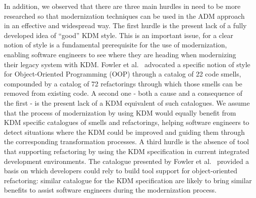 In addition, we observed that there are three main hurdles in need to be more researched so that modernization techniques can be used in the ADM approach in an effective and widespread way. The first hurdle is the present lack of a fully developed idea of ``good'' KDM style. This is an important issue, for a clear notion of style is a fundamental prerequisite for the use of modernization, enabling software engineers to see where they are heading when modernizing their legacy system with KDM. Fowler et al.~\cite{refactImpro} advocated a specific notion of style for Object-Oriented Programming (OOP) through a catalog of 22 code smells, compounded by a catalog of 72 refactorings through which those smells can be removed from existing code. A second one - both a cause and a consequence of the first - is the present lack of a KDM equivalent of such catalogues. We assume that the process of modernization by using KDM would equally benefit from KDM specific catalogues of smells and refactorings, helping software engineers to detect situations where the KDM could be improved and guiding them through the corresponding transformation processes. A third hurdle is the absence of tool that supporting refactoring by using the KDM specification in current integrated development environments. The catalogue presented by Fowler et al.~\cite{refactImpro} provided a basis on which developers could rely to build tool support for object-oriented refactoring: similar catalogue for the KDM specification are likely to bring similar benefits to assist software engineers during the modernization process.